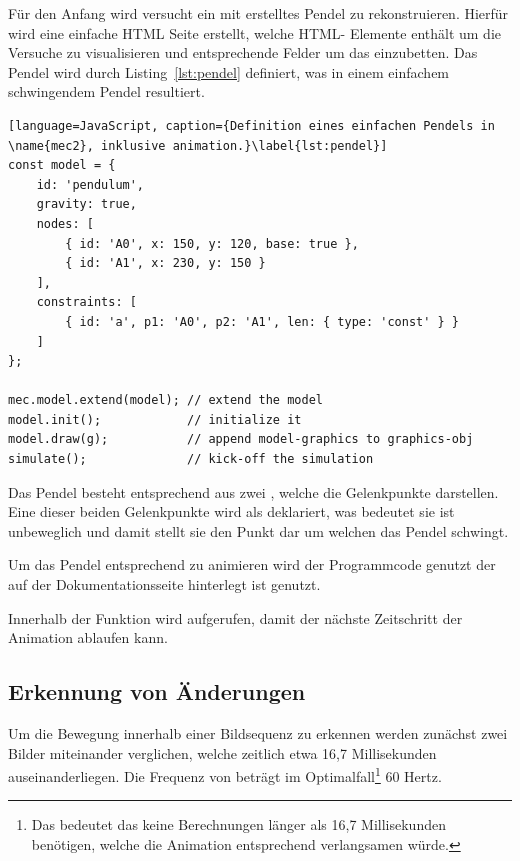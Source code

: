 Für den Anfang wird versucht ein mit  erstelltes Pendel zu rekonstruieren.
Hierfür wird eine einfache HTML Seite erstellt, welche HTML- Elemente enthält um die Versuche zu visualisieren und entsprechende  Felder um das  einzubetten.
Das Pendel wird durch Listing~\ref{lst:pendel} definiert, was in einem einfachem schwingendem Pendel resultiert.

\begin{lstlisting}[language=JavaScript, caption={Definition eines einfachen Pendels in \name{mec2}, inklusive animation.}\label{lst:pendel}]
const model = {
    id: 'pendulum',
    gravity: true,
    nodes: [
        { id: 'A0', x: 150, y: 120, base: true },
        { id: 'A1', x: 230, y: 150 }
    ],
    constraints: [
        { id: 'a', p1: 'A0', p2: 'A1', len: { type: 'const' } }
    ]
};

mec.model.extend(model); // extend the model
model.init();            // initialize it
model.draw(g);           // append model-graphics to graphics-obj
simulate();              // kick-off the simulation
\end{lstlisting}

Das Pendel besteht entsprechend aus zwei , welche die Gelenkpunkte darstellen.
Eine dieser beiden Gelenkpunkte wird als  deklariert, was bedeutet sie ist unbeweglich und damit stellt sie den Punkt dar um welchen das Pendel schwingt.

Um das Pendel entsprechend zu animieren wird der Programmcode genutzt der auf der Dokumentationsseite  hinterlegt ist genutzt.

Innerhalb der  Funktion wird  aufgerufen, damit der nächste Zeitschritt der Animation ablaufen kann.

\subsection{Erkennung von Änderungen}

Um die Bewegung innerhalb einer Bildsequenz zu erkennen werden zunächst zwei Bilder miteinander verglichen, welche zeitlich etwa 16,7 Millisekunden auseinanderliegen.
Die Frequenz von  beträgt im Optimalfall\footnote{Das bedeutet das keine Berechnungen länger als 16,7 Millisekunden benötigen, welche die Animation entsprechend verlangsamen würde.} 60 Hertz.

